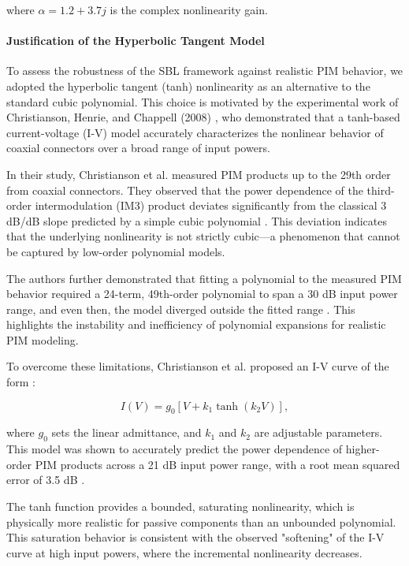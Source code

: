 where \( \alpha = 1.2 + 3.7j \) is the complex nonlinearity gain.

\paragraph{Justification of the Hyperbolic Tangent Model}

To assess the robustness of the SBL framework against realistic PIM behavior, we adopted the hyperbolic tangent (tanh) nonlinearity as an alternative to the standard cubic polynomial. This choice is motivated by the experimental work of Christianson, Henrie, and Chappell (2008) \cite{Christianson2008HigherOrder,Henrie2008Prediction}, who demonstrated that a tanh-based current-voltage (I-V) model accurately characterizes the nonlinear behavior of coaxial connectors over a broad range of input powers.

In their study, Christianson et al. measured PIM products up to the 29th order from coaxial connectors. They observed that the power dependence of the third-order intermodulation (IM3) product deviates significantly from the classical 3 dB/dB slope predicted by a simple cubic polynomial \cite{Christianson2008HigherOrder}. This deviation indicates that the underlying nonlinearity is not strictly cubic—a phenomenon that cannot be captured by low-order polynomial models.

The authors further demonstrated that fitting a polynomial to the measured PIM behavior required a 24-term, 49th-order polynomial to span a 30 dB input power range, and even then, the model diverged outside the fitted range \cite{Christianson2008HigherOrder}. This highlights the instability and inefficiency of polynomial expansions for realistic PIM modeling.

To overcome these limitations, Christianson et al. proposed an I-V curve of the form \cite{Henrie2008Prediction}:

\begin{equation}
I(V) = g_0 \left[ V + k_1 \tanh(k_2 V) \right],
\end{equation}

where \(g_0\) sets the linear admittance, and \(k_1\) and \(k_2\) are adjustable parameters. This model was shown to accurately predict the power dependence of higher-order PIM products across a 21 dB input power range, with a root mean squared error of 3.5 dB \cite{Christianson2008HigherOrder}.

The tanh function provides a bounded, saturating nonlinearity, which is physically more realistic for passive components than an unbounded polynomial. This saturation behavior is consistent with the observed "softening" of the I-V curve at high input powers, where the incremental nonlinearity decreases.

